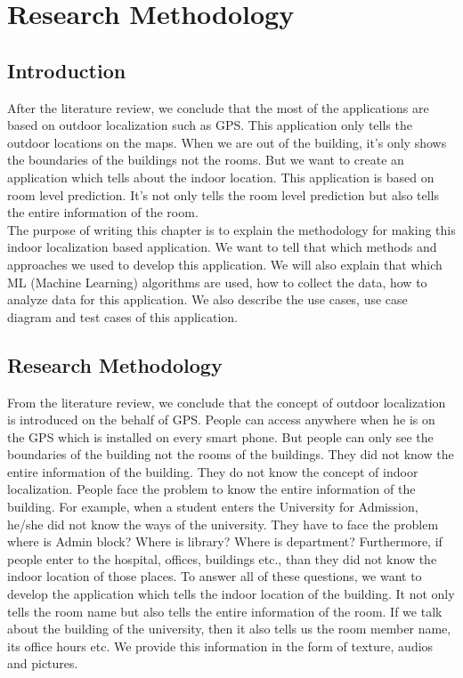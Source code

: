 
\chapter{Research Methodology} %
\label{Chapter 4}

\section{Introduction}
After the literature review, we conclude that the most of the applications are based on outdoor localization such as GPS. This application only tells the outdoor locations on the maps. When we are out of the building, it’s only shows the boundaries of the buildings not the rooms. But we want to create an application which tells about the indoor location. This application is based on room level prediction. It’s not only tells the room level prediction but also tells the entire information of the room. 
\\
The purpose of writing this chapter is to explain the methodology for making this indoor localization based application. We want to tell that which methods and approaches we used to develop this application. We will also explain that which ML (Machine Learning) algorithms are used, how to collect the data, how to analyze data for this application. We also describe the use cases, use case diagram and test cases of this application. 

\section{Research Methodology}
From the literature review, we conclude that the concept of outdoor localization is introduced on the behalf of GPS. People can access anywhere when he is on the GPS which is installed on every smart phone. But people can only see the boundaries of the building not the rooms of the buildings. They did not know the entire information of the building. They do not know the concept of indoor localization. People face the problem to know the entire information of the building. For example, when a student enters the University for Admission, he/she did not know the ways of the university. They have to face the problem where is Admin block? Where is library? Where is department? Furthermore, if people enter to the hospital, offices, buildings etc., than they did not know the indoor location of those places.  To answer all of these questions, we want to develop the application which tells the indoor location of the building. It not only tells the room name but also tells the entire information of the room. If we talk about the building of the university, then it also tells us the room member name, its office hours etc. We provide this information in the form of texture, audios and pictures.
\\\\
